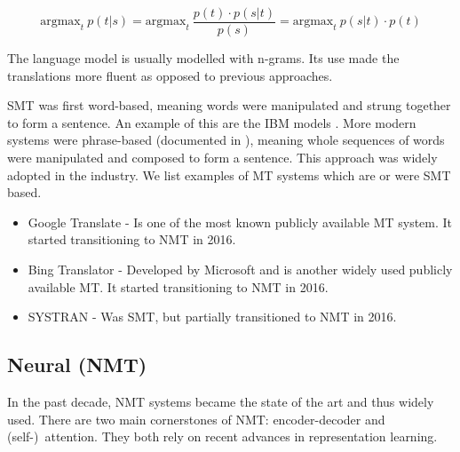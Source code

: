 \begin{equation}
    \text{argmax}_t\ p(t|s) = \text{argmax}_t\ \frac{p(t)\cdot p(s|t)}{p(s)} = \text{argmax}_t\ p(s|t)\cdot p(t)
    \label{eq:language_bayes}
\end{equation}

The language model is usually modelled with n-grams. Its use made the translations more fluent as opposed to previous approaches.

SMT was first word-based, meaning words were manipulated and strung together to form a sentence. An example of this are the IBM models \citep{brown_ibm_1_2_3_4_5:1993}. More modern systems were phrase-based (documented in \citep{koehn2003statistical}), meaning whole sequences of words were manipulated and composed to form a sentence. This approach was widely adopted in the industry. We list examples of MT systems which are or were SMT based.

\begin{itemize}
    \item Google Translate - Is one of the most known publicly available MT system. It started transitioning to NMT in 2016.
    \item Bing Translator - Developed by Microsoft and is another widely used publicly available MT. It started transitioning to NMT in 2016.
    \item SYSTRAN - Was SMT, but partially transitioned to NMT in 2016.
\end{itemize}

\subsection{Neural (NMT)}

In the past decade, NMT systems became the state of the art and thus widely used. There are two main cornerstones of NMT: encoder-decoder and (self-)~attention. They both rely on recent advances in representation learning.

